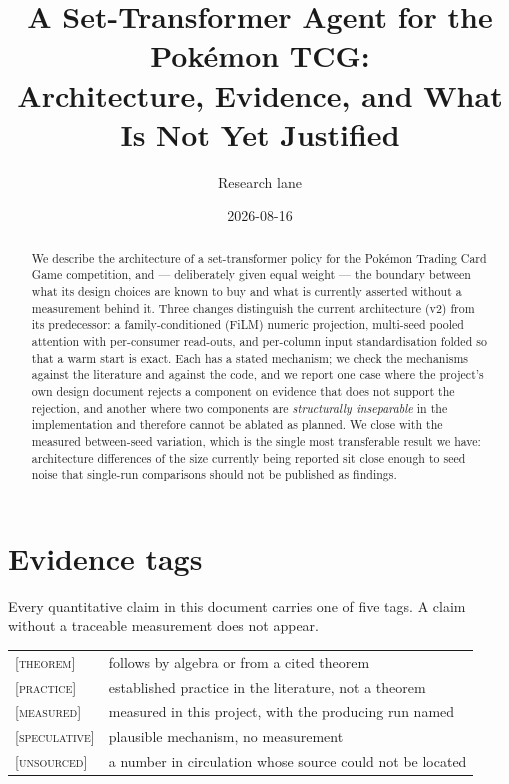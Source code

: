 \documentclass[11pt,a4paper]{article}
\title{\bfseries A Set-Transformer Agent for the Pok\'emon TCG:\\
Architecture, Evidence, and What Is Not Yet Justified}
\author{Research lane}
\date{2026-08-16}
\newcommand{\tagM}{\textcolor{cV2}{\textsc{[measured]}}}
\newcommand{\tagT}{\textsc{[theorem]}}
\newcommand{\tagP}{\textsc{[practice]}}
\newcommand{\tagS}{\textcolor{cBad}{\textsc{[speculative]}}}
\newcommand{\tagU}{\textcolor{cBad}{\textsc{[unsourced]}}}
\begin{document}
\maketitle

\begin{abstract}
\noindent
We describe the architecture of a set-transformer policy for the Pok\'emon Trading
Card Game competition, and --- deliberately given equal weight --- the boundary
between what its design choices are known to buy and what is currently asserted
without a measurement behind it. Three changes distinguish the current
architecture (v2) from its predecessor: a family-conditioned (FiLM) numeric
projection, multi-seed pooled attention with per-consumer read-outs, and
per-column input standardisation folded so that a warm start is exact. Each has
a stated mechanism; we check the mechanisms against the literature and against
the code, and we report one case where the project's own design document rejects
a component on evidence that does not support the rejection, and another where
two components are \emph{structurally inseparable} in the implementation and
therefore cannot be ablated as planned. We close with the measured
between-seed variation, which is the single most transferable result we have:
architecture differences of the size currently being reported sit close enough
to seed noise that single-run comparisons should not be published as findings.
\end{abstract}

\section{Evidence tags}

Every quantitative claim in this document carries one of five tags. A claim
without a traceable measurement does not appear.

\begin{center}
\begin{tabular}{ll}
\toprule
\tagT & follows by algebra or from a cited theorem \\
\tagP & established practice in the literature, not a theorem \\
\tagM & measured in this project, with the producing run named \\
\tagS & plausible mechanism, no measurement \\
\tagU & a number in circulation whose source could not be located \\
\bottomrule
\end{tabular}
\end{center}
\end{document}
